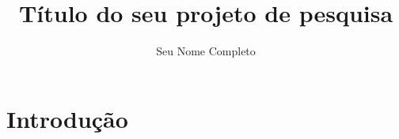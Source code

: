 \documentclass[12pt,a4paper,oneside]{book}
\title{Título do seu projeto de pesquisa}
\author{Seu Nome Completo}
\begin{document}
\frontmatter

\maketitle

\folhaaprovacao

\makeabstracts


\tableofcontents

\mainmatter



\chapter{Introdução}\label{cap:introducao}
\end{document}
